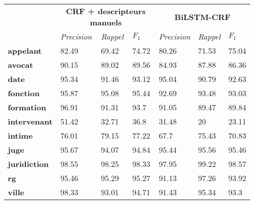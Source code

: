 \begin{table}[!ht]
	\scriptsize
	\centering
	\begin{tabular}{|l|l|l|l|l|l|l|}
		\hline
		&               \multicolumn{3}{c}{\textbf{CRF + descripteurs manuels}} & \multicolumn{3}{|c|}{\textbf{BiLSTM-CRF}}   \\ \cline{2-7}
		& \textit{Precision} & \textit{Rappel}                     & $F_1$ & \textit{Precision} & \textit{Rappel}      & $F_1$ \\ \hline
		\textbf{appelant}      & 82.49              & 69.42                               & 74.72       & 80.26              & 71.53                & 75.04       \\ 
		\textbf{avocat}        & 90.15              & 89.02                               & 89.56       & 84.93              & 87.88                & 86.36       \\ 
		\textbf{date}          & 95.34              & 91.46                               & 93.12       & 95.04              & 90.79                & 92.63       \\ 
		\textbf{fonction}      & 95.87              & 95.08                               & 95.44       & 92.69              & 93.48                & 93.03       \\ 
		\textbf{formation}     & 96.91              & 91.31                               & 93.7        & 91.05              & 89.47                & 89.84       \\ 
		\textbf{intervenant}   & 51.42              & 32.71                               & 36.8        & 31.48              & 20                   & 23.11       \\ 
		\textbf{intime}        & 76.01              & 79.15                               & 77.22       & 67.7               & 75.43                & 70.83       \\ 
		\textbf{juge}          & 95.67              & 94.07                               & 94.84       & 95.44              & 95.56                & 95.46       \\ 
		\textbf{juridiction}   & 98.55              & 98.25                               & 98.33       & 97.95              & 99.22                & 98.57       \\ 
		\textbf{rg}            & 95.46              & 95.29                               & 95.27       & 91.13              & 97.26                & 93.92       \\ 
		\textbf{ville}         & 98.33              & 93.01                               & 94.71       & 91.43              & 95.34                & 93.3        \\ 

\end{tabular}
\end{table}
